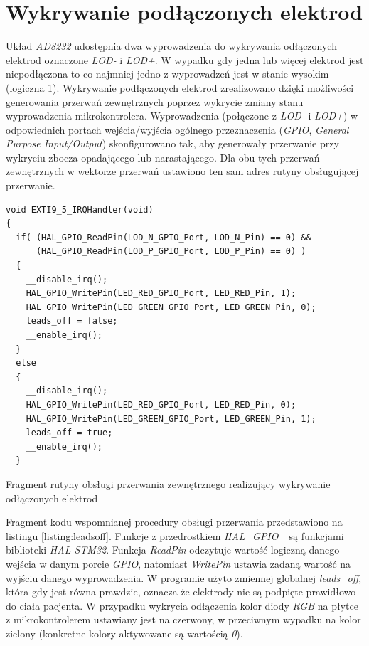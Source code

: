 \newpage

\section{Wykrywanie podłączonych elektrod}

Układ \textit{AD8232} udostępnia dwa wyprowadzenia do wykrywania odłączonych elektrod oznaczone \textit{LOD-} i \textit{LOD+}.
W wypadku gdy jedna lub więcej elektrod jest niepodłączona to co najmniej jedno z wyprowadzeń jest w stanie wysokim 
(logiczna 1).
Wykrywanie podłączonych elektrod zrealizowano dzięki możliwości generowania przerwań zewnętrznych poprzez wykrycie zmiany
stanu wyprowadzenia mikrokontrolera. Wyprowadzenia (połączone z \textit{LOD-} i \textit{LOD+}) w odpowiednich portach 
wejścia/wyjścia ogólnego przeznaczenia (\textit{GPIO}, \textit{General Purpose Input/Output})
skonfigurowano tak, aby generowały przerwanie przy wykryciu zbocza opadającego lub narastającego. 
Dla obu tych przerwań zewnętrznych w wektorze przerwań ustawiono ten sam adres rutyny obsługującej przerwanie.

\begin{listing}
\begin{verbatim}
void EXTI9_5_IRQHandler(void)
{
  if( (HAL_GPIO_ReadPin(LOD_N_GPIO_Port, LOD_N_Pin) == 0) &&
      (HAL_GPIO_ReadPin(LOD_P_GPIO_Port, LOD_P_Pin) == 0) )
  {
    __disable_irq();
    HAL_GPIO_WritePin(LED_RED_GPIO_Port, LED_RED_Pin, 1);
    HAL_GPIO_WritePin(LED_GREEN_GPIO_Port, LED_GREEN_Pin, 0);
    leads_off = false;
    __enable_irq();
  }
  else
  {
    __disable_irq();
    HAL_GPIO_WritePin(LED_RED_GPIO_Port, LED_RED_Pin, 0);
    HAL_GPIO_WritePin(LED_GREEN_GPIO_Port, LED_GREEN_Pin, 1);
    leads_off = true;
    __enable_irq();
  }
\end{verbatim} 
\caption{Fragment rutyny obsługi przerwania zewnętrznego 
          realizujący wykrywanie odłączonych elektrod}
\label{listing:leadsoff}
\end{listing}

Fragment kodu wspomnianej procedury obsługi przerwania przedstawiono na listingu \ref{listing:leadsoff}.
Funkcje z przedrostkiem \textit{HAL\_GPIO\_} są funkcjami biblioteki \textit{HAL STM32}. Funkcja
\textit{ReadPin} odczytuje wartość logiczną danego wejścia w danym porcie \textit{GPIO}, natomiast
\textit{WritePin} ustawia zadaną wartość na wyjściu danego wyprowadzenia. W programie użyto zmiennej globalnej
\textit{leads\_off}, która gdy jest równa prawdzie, oznacza że elektrody nie są podpięte prawidłowo do ciała pacjenta.
W przypadku wykrycia odłączenia kolor diody \textit{RGB} na płytce z mikrokontrolerem ustawiany jest na czerwony, w
przeciwnym wypadku na kolor zielony (konkretne kolory aktywowane są wartością \textit{0}).

